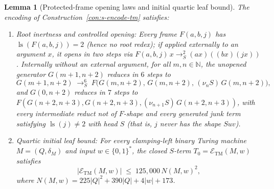 \documentclass[11pt,reqno]{amsart}
\numberwithin{equation}{section}
\theoremstyle{plain}
\newtheorem{lemma}[theorem]{Lemma}
\theoremstyle{definition}
\theoremstyle{remark}
\DeclareMathOperator{\ls}{ls}
\newcommand{\redS}{\to_S}
\begin{document}
\begin{lemma}[Protected-frame opening laws and initial quartic leaf bound]\label{lem:frame-open-bound}
The encoding of Construction~\ref{con:s-encode-tm} satisfies:
\begin{enumerate}[label=(\roman*),leftmargin=2.2em]
  \item \emph{Root inertness and controlled opening:} Every frame $F(a,b,j)$ has $\ls(F(a,b,j)) = 2$ (hence no root redex); if applied externally to an argument $x$, it opens in two steps via $F(a,b,j)\,x \redS^2 (a x)((b x)(j x))$. Internally without an external argument, for all $m, n \in \mathbb{N}$, the unopened generator $G(m+1, n+2)$ reduces in $6$ steps to
  \[
    G(m+1, n+2) \;\redS^6\; F\bigl(G(m, n+2),\, G(m, n+2),\, (\nu_n S)\,G(m, n+2)\bigr),
  \]
  and $G(0, n+2)$ reduces in $7$ steps to $F(G(n+2, n+3), G(n+2, n+3), (\nu_{n+1} S)\,G(n+2, n+3))$, with every intermediate reduct not of $F$-shape and every generated junk term satisfying $\ls(j) \ne 2$ with head $S$ (that is, $j$ never has the shape $S u v$).
  \item \emph{Quartic initial leaf bound:} For every clamping-left binary Turing machine $M = (Q, \delta_M)$ and input $w \in \{0,1\}^*$, the closed $S$-term $T_0 = \mathcal{E}_{\mathrm{TM}}(M, w)$ satisfies
  \begin{equation}\label{eq:tm-init-bound}
    |\mathcal{E}_{\mathrm{TM}}(M, w)| \;\le\; 125{,}000\,N(M, w)^2,
  \end{equation}
  where $N(M,w) = 225|Q|^2 + 390|Q| + 4|w| + 173$.
\end{enumerate}
\end{lemma}
\end{document}
